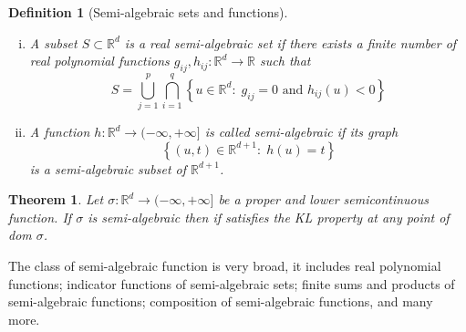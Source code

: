\documentclass[12pt]{article}
\numberwithin{equation}{section}
\newtheorem{definition}{Definition}
\newtheorem{theorem}{Theorem}
\newcommand{\rr}{\mathbb{R}} %
\begin{document}
\begin{definition}[Semi-algebraic sets and functions] 
\begin{enumerate}[(i)]
	\item A subset $S \subset \rr^d$ is a real semi-algebraic set if there exists a finite number of real polynomial functions $g_{ij}, h_{ij}: \rr^d \rightarrow \rr$ such that
	\begin{equation*}
		S = \bigcup\limits_{j=1}^{p} \bigcap\limits_{i=1}^{q} \left\lbrace u \in \rr^d : \; g_{ij}=0 \text{ and } h_{ij}(u)<0 \right\rbrace
	\end{equation*}
	\item A function $h:\rr^d \rightarrow (-\infty, +\infty]$ is called semi-algebraic if its graph
	\begin{equation*}
		\left\lbrace (u,t)\in\rr^{d+1} : \; h(u)=t \right\rbrace
	\end{equation*}
	is a semi-algebraic subset of $\rr^{d+1}$.
\end{enumerate}
\end{definition}

\begin{theorem} \label{SA_is_KL}
Let $\sigma:\rr^d \rightarrow (-\infty, +\infty]$ be a proper and lower semicontinuous function. If $\sigma$ is semi-algebraic then if satisfies the KL property at any point of dom $\sigma$.
\end{theorem}
The class of semi-algebraic function is very broad, it includes real polynomial functions; indicator functions of semi-algebraic sets; finite sums and products of semi-algebraic functions; composition of semi-algebraic functions, and many more.
\end{document}
